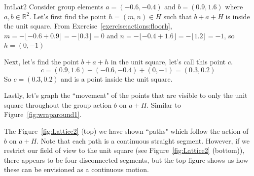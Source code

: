 \begin{example}{IntLat2} Consider group elements $a=(-0.6,-0.4)$ and $b=(0.9,1.6)$ where $a,b \in \mathbb{R}^2$.
Let's first find the point $h=(m,n) \in H$ such that $b+a+H$ is inside the unit square. From Exercise~\ref{exercise:actions:floorh}, $m=-\lfloor -0.6+0.9 \rfloor=-\lfloor 0.3 \rfloor=0$ and $n=-\lfloor -0.4+1.6 \rfloor=-\lfloor 1.2 \rfloor=-1$, so $h=(0,-1)$

Next, let's find the point $b+a+h$ in the unit square, let's call this point $c$. $$c=(0.9,1.6)+(-0.6,-0.4)+(0,-1)=(0.3,0.2)$$ So $c=(0.3,0.2)$ and is a point inside the unit square.

Lastly, let's graph the ``movement" of the points that are visible to only the unit square throughout the group action $b$ on $a+H$. Similar to Figure~\ref{fig:wraparound1}.

The Figure~\ref{fig:Lattice2} (top) we have shown ``paths" which follow the action of $b$ on $a+H$. Note that each path is a continuous straight segment. However, if we restrict our field of view to the unit square (see Figure~\ref{fig:Lattice2} (bottom)), there appears to be four disconnected segments, but the top figure shows us how these can be envisioned as a continuous motion.


\end{example}
